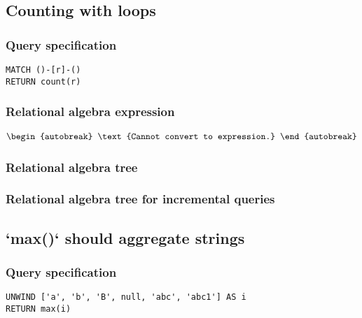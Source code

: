 \subsection{Counting with loops}

\subsubsection*{Query specification}

\begin{lstlisting}
MATCH ()-[r]-()
RETURN count(r)
\end{lstlisting}

\subsubsection*{Relational algebra expression}

\begin{align*}
\begin{autobreak}
\text{Cannot convert to expression.}
\end{autobreak}
\end{align*}

\subsubsection*{Relational algebra tree}


\subsubsection*{Relational algebra tree for incremental queries}


\subsection{`max()` should aggregate strings}

\subsubsection*{Query specification}

\begin{lstlisting}
UNWIND ['a', 'b', 'B', null, 'abc', 'abc1'] AS i
RETURN max(i)
\end{lstlisting}

